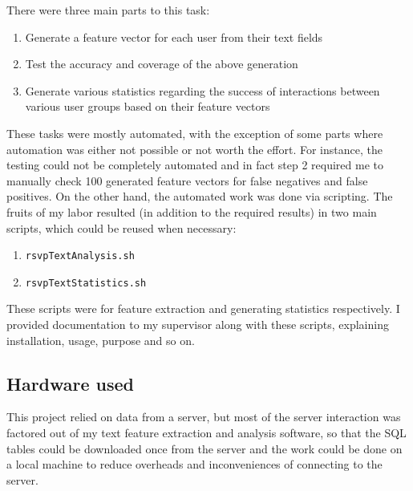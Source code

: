 \documentclass{report}
\begin{document}
There were three main parts to this task:
\begin{enumerate}
  \item Generate a feature vector for each user from their text fields
  \item Test the accuracy and coverage of the above generation
  \item Generate various statistics regarding the success of interactions between various user groups based on their feature vectors
\end{enumerate}

These tasks were mostly automated, with the exception of some parts where automation was either not possible or not worth the effort. For instance, the testing could not be completely automated and in fact step 2 required me to manually check 100 generated feature vectors for false negatives and false positives. On the other hand, the automated work was done via scripting. The fruits of my labor resulted (in addition to the required results) in two main scripts, which could be reused when necessary:
\begin{enumerate}
  \item \begin{verbatim}rsvpTextAnalysis.sh\end{verbatim}
  \item \begin{verbatim}rsvpTextStatistics.sh\end{verbatim}
\end{enumerate}

These scripts were for feature extraction and generating statistics respectively. I provided documentation to my supervisor along with these scripts, explaining installation, usage, purpose and so on.

\subsection{Hardware used}
This project relied on data from a server, but most of the server interaction was factored out of my text feature extraction and analysis software, so that the SQL tables could be downloaded once from the server and the work could be done on a local machine to reduce overheads and inconveniences of connecting to the server.
\end{document}
